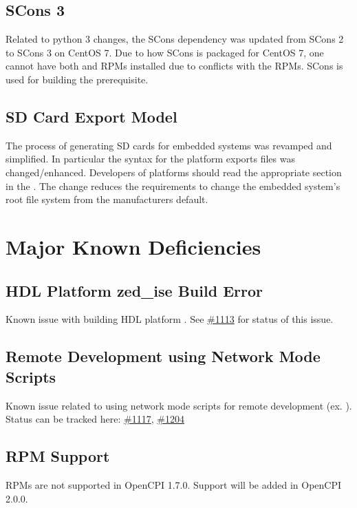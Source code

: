 \subsection{SCons 3}
\label{sec:17_scons3}
Related to python 3 changes, the SCons dependency was updated from SCons 2 to SCons 3 on CentOS 7. Due to how SCons is packaged for CentOS 7, one cannot have both  and  RPMs installed due to conflicts with the RPMs. SCons is used for building the  prerequisite.

\subsection{SD Card Export Model}
\label{sec:17_sd_card}
The process of generating SD cards for embedded systems was revamped and simplified.  In particular the syntax for the platform exports files was changed/enhanced.  Developers of platforms should read the appropriate section in the .  The change reduces the requirements to change the embedded system's root file system from the manufacturers default.

\section{Major Known Deficiencies}
\label{sec:17_bugs}

\subsection{HDL Platform zed\_{}ise Build Error}
\label{bug:1113}
Known issue with building HDL platform . See \href{https://gitlab.com/opencpi/opencpi/-/issues/1113}{\#{}1113} for status of this issue.

\subsection{Remote Development using Network Mode Scripts}
\label{bug:1117}
Known issue related to using network mode scripts for remote development (ex. ). Status can be tracked here: \href{https://gitlab.com/opencpi/opencpi/-/issues/1117}{\#{}1117},  \href{https://gitlab.com/opencpi/opencpi/-/issues/1204}{\#{}1204}

\subsection{RPM Support}
\label{bug:17_rpms}
RPMs are not supported in OpenCPI 1.7.0. Support will be added in OpenCPI 2.0.0.

